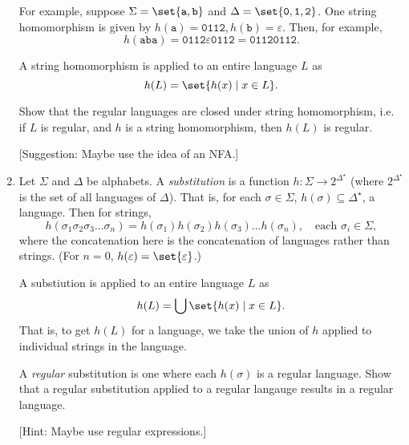 \documentclass{cs81-homework}
\begin{document}
\begin{enumerate}
  For example, suppose \(\Sigma = \set{\mathtt a, \mathtt b}\) and
  \(\Delta = \set{\mathtt 0, \mathtt 1, \mathtt 2}\).  One string homomorphism
  is given by \(h(\mathtt a) = \mathtt{0112}, h(\mathtt b) = \varepsilon\).
  Then, for example,
  \[
    h(\mathtt{aba}) = \mathtt{0112}\varepsilon\mathtt{0112} = \mathtt{01120112}.
  \]

  A string homomorphism is applied to an entire language \(L\) as
  \[
    h(L) = \set{h(x) \mid x \in L}.
  \]

  Show that the regular languages are closed under string homomorphism, i.e. if
  \(L\) is regular, and \(h\) is a string homomorphism, then \(h(L)\) is
  regular.

  [Suggestion: Maybe use the idea of an NFA.]

\item {} Let \(\Sigma\) and \(\Delta\) be alphabets.  A
  \emph{substitution} is a function \(h \colon \Sigma \to 2^{\Delta^\star}\)
  (where \(2^{\Delta^\star}\) is the set of all languages of \(\Delta\)).  That
  is, for each \(\sigma \in \Sigma\), \(h(\sigma) \subseteq \Delta^\star\), a
  language.  Then for strings,
  \[
    h(\sigma_1 \sigma_2 \sigma_3 \dots \sigma_n) = h(\sigma_1) h(\sigma_2)
    h(\sigma_3) \dots h(\sigma_n), \quad \text{each \(\sigma_i \in \Sigma\)},
  \]
  where the concatenation here is the concatenation of languages rather than
  strings.  (For \(n = 0\), \(h(\varepsilon) = \set{\varepsilon}\).)

  A substiution is applied to an entire language \(L\) as
  \[
    h(L) = \bigcup \set{h(x) \mid x \in L}.
  \]
  That is, to get \(h(L)\) for a language, we take the union of \(h\) applied to
  individual strings in the language.

  A \emph{regular} substitution is one where each \(h(\sigma)\) is a regular
  language.  Show that a regular substitution applied to a regular langauge
  results in a regular language.

  [Hint: Maybe use regular expressions.]
  
  
\end{enumerate}
\end{document}
